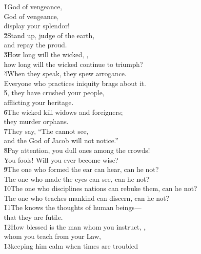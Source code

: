\begin{poetry}
\poeml \v{1}God of vengeance, \\
\poemll    {} God of vengeance, \\
\poemlll       display your splendor! \\
\poeml \v{2}Stand up, judge of the earth, \\
\poemll    and repay the proud. \\
\poeml \v{3}How long will the wicked, , \\
\poemll    how long will the wicked continue to triumph? \\
\poeml \v{4}When they speak, they spew arrogance. \\
\poemll    Everyone who practices iniquity brags about it. \\
\poeml \v{5}, they have crushed your people, \\
\poemll    afflicting your heritage. \\
\poeml \v{6}The wicked kill widows and foreigners; \\
\poemll    they murder orphans. \\
\poeml \v{7}They say, ``The  cannot see, \\
\poemll    and the God of Jacob will not notice.'' \\
\poeml \v{8}Pay attention, you dull ones among the crowds! \\
\poemll    You fools! Will you ever become wise? \\
\poeml \v{9}The one who formed the ear can hear, can he not? \\
\poemll    The one who made the eyes can see, can he not? \\
\poeml \v{10}The one who disciplines nations can rebuke them, can he not? \\
\poemll    The one who teaches mankind can discern, can he not? \\
\poeml \v{11}The  knows the thoughts of human beings--- \\
\poemll    that they are futile. \\
\poeml \v{12}How blessed is the man whom you instruct, , \\
\poemll    whom you teach from your Law, \\
\poeml \v{13}keeping him calm when times are troubled \\

\end{poetry}
